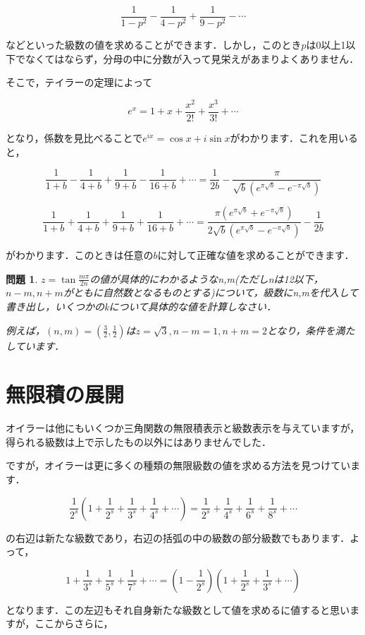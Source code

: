 \documentclass[./main]{subfiles}
\theoremstyle{break}
\newtheorem*{prb}{問題}
\begin{document}
\[\frac{1}{1-p^2}-\frac{1}{4-p^2}+\frac{1}{9-p^2}-\cdots\]

などといった級数の値を求めることができます．しかし，このとき$p$は0以上1以下でなくてはならず，分母の中に分数が入って見栄えがあまりよくありません．

そこで，テイラーの定理によって

\[e^x=1+x+\frac{x^2}{2!}+\frac{x^3}{3!}+\cdots\]

となり，係数を見比べることで$e^{ix}=\cos x+i\sin x$がわかります．これを用いると，

\[\frac{1}{1+b}-\frac{1}{4+b}+\frac{1}{9+b}-\frac{1}{16+b}+\cdots=\frac{1}{2b}-\frac{\pi}{\sqrt{b}(e^{\pi\sqrt{b}}-e^{-\pi\sqrt{b}})}\]

\[\frac{1}{1+b}+\frac{1}{4+b}+\frac{1}{9+b}+\frac{1}{16+b}+\cdots=\frac{\pi(e^{\pi\sqrt{b}}+e^{-\pi\sqrt{b}})}{2\sqrt{b}(e^{\pi\sqrt{b}}-e^{-\pi\sqrt{b}})}-\frac{1}{2b}\]

がわかります．このときは任意の$b$に対して正確な値を求めることができます．

\begin{prb}
$z=\tan\frac{m\pi}{2n}$の値が具体的にわかるようなn,m(ただしnは12以下，$n-m,n+m$がともに自然数となるものとする)について，級数にn,mを代入して書き出し，いくつかのkについて具体的な値を計算しなさい．

例えば，$(n,m)=(\frac{3}{2},\frac{1}{2})$は$z=\sqrt{3},n-m=1,n+m=2$となり，条件を満たしています．
\end{prb}
\section{無限積の展開}
オイラーは他にもいくつか三角関数の無限積表示と級数表示を与えていますが，得られる級数は上で示したもの以外にはありませんでした．

ですが，オイラーは更に多くの種類の無限級数の値を求める方法を見つけています．

\[\frac{1}{2^s}\left( 1+\frac{1}{2^s}+\frac{1}{3^s}+\frac{1}{4^s}+\cdots \right)=\frac{1}{2^s}+\frac{1}{4^s}+\frac{1}{6^s}+\frac{1}{8^s}+\cdots\]

の右辺は新たな級数であり，右辺の括弧の中の級数の部分級数でもあります．よって，

\[1+\frac{1}{3^s}+\frac{1}{5^s}+\frac{1}{7^s}+\cdots=\left( 1-\frac{1}{2^s} \right)\left( 1+\frac{1}{2^s}+\frac{1}{3^s}+\cdots \right)\]

となります．この左辺もそれ自身新たな級数として値を求めるに値すると思いますが，ここからさらに，
\end{document}
